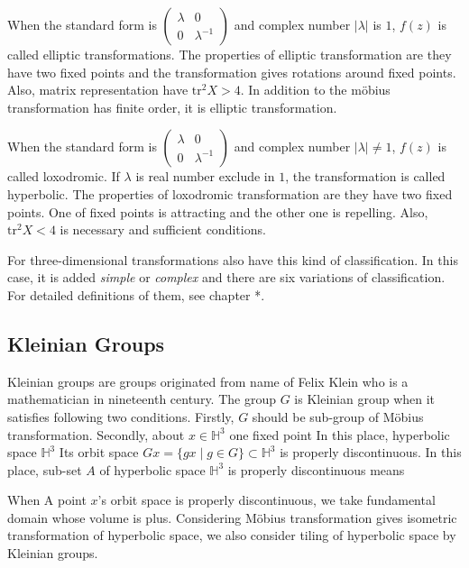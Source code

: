 When the standard form is
$\begin{pmatrix}\lambda & 0 \\ 0 & \lambda^{-1} \end{pmatrix}$
and complex number $|\lambda|$ is $1$, $f(z)$ is called elliptic
transformations. The properties of elliptic transformation are they have
two fixed points and the transformation gives rotations around fixed
points.
Also, matrix representation have $\mathrm{tr}^2X > 4$.
In addition to the m\"obius transformation has finite order,
it is elliptic transformation.

When the standard form is
$\begin{pmatrix}\lambda & 0 \\ 0 & \lambda^{-1} \end{pmatrix}$
and complex number $|\lambda| \neq 1$, $f(z)$ is called loxodromic.
If $\lambda$ is real number exclude in $1$, the transformation is called
hyperbolic.
The properties of loxodromic transformation are they have two fixed
points. One of fixed points is attracting and the other one is repelling.
Also, $\mathrm{tr}^2X < 4$ is necessary and sufficient conditions.

For three-dimensional transformations also have this kind of
classification.
In this case, it is added \textit{simple} or \textit{complex} and
there are six variations of classification.
For detailed definitions of them, see chapter *.

\subsection{Kleinian Groups}

Kleinian groups are groups originated from name of Felix Klein who is
a mathematician in nineteenth century.
The group $G$ is Kleinian group when it satisfies following two
conditions. 
Firstly, $G$ should be sub-group of M\"obius transformation.
Secondly, about $x\in\mathbb{H}^3$ one fixed point 
In this place, hyperbolic space $\mathbb{H}^3$
Its orbit space $Gx = \{ gx \mid g\in G\}\subset \mathbb{H}^3$
is properly discontinuous.
In this place, sub-set $A$ of hyperbolic space $\mathbb{H}^3$
is properly discontinuous means 

When A point $x$'s orbit space is properly discontinuous, we take
fundamental domain whose volume is plus.
Considering M\"obius transformation gives isometric transformation of
hyperbolic space, we also consider tiling of hyperbolic space by
Kleinian groups. 

